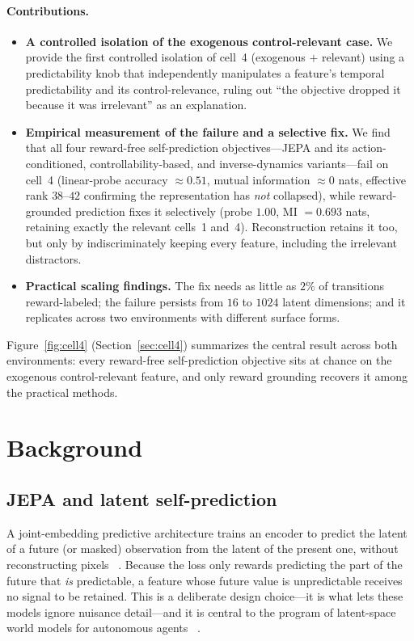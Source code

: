 \documentclass[11pt]{article}
\newcommand{\probe}{linear-probe accuracy}
\begin{document}
\paragraph{Contributions.}
\begin{itemize}
  \item \textbf{A controlled isolation of the exogenous control-relevant case.} We provide the
  first controlled isolation of cell~4 (exogenous $+$ relevant) using a predictability knob that
  independently manipulates a feature's temporal predictability and its control-relevance, ruling
  out ``the objective dropped it because it was irrelevant'' as an explanation.
  \item \textbf{Empirical measurement of the failure and a selective fix.} We find that all four
  reward-free self-prediction objectives---JEPA and its action-conditioned, controllability-based,
  and inverse-dynamics variants---fail on cell~4 (\probe{} $\approx 0.51$, mutual information
  $\approx 0$ nats, effective rank $38$--$42$ confirming the representation has \emph{not}
  collapsed), while reward-grounded prediction fixes it selectively (probe $1.00$, MI $=0.693$
  nats, retaining exactly the relevant cells~1 and~4). Reconstruction retains it too, but only by
  indiscriminately keeping every feature, including the irrelevant distractors.
  \item \textbf{Practical scaling findings.} The fix needs as little as $2\%$ of transitions
  reward-labeled; the failure persists from $16$ to $1024$ latent dimensions; and it replicates
  across two environments with different surface forms.
\end{itemize}

\noindent
Figure~\ref{fig:cell4} (Section~\ref{sec:cell4}) summarizes the central result across both
environments: every reward-free self-prediction objective sits at chance on the exogenous
control-relevant feature, and only reward grounding recovers it among the practical methods.

\section{Background}

\subsection{JEPA and latent self-prediction}
A joint-embedding predictive architecture trains an encoder to predict the latent of a future (or
masked) observation from the latent of the present one, without reconstructing pixels
~\citep{assran2023ijepa}. Because the loss only rewards predicting the part of the future that
\emph{is} predictable, a feature whose future value is unpredictable receives no signal to be
retained. This is a deliberate design choice---it is what lets these models ignore nuisance
detail---and it is central to the program of latent-space world models for autonomous agents
~\citep{lecun2022path}.
\end{document}

